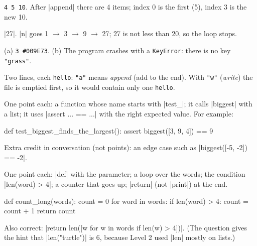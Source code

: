 \begin{answer}
\texttt{4 5 10}. After \py|append| there are 4 items; index 0 is the first (5), index 3 is the new 10.
\end{answer}

\begin{answer}
\py|27|. \py|n| goes 1 $\rightarrow$ 3 $\rightarrow$ 9 $\rightarrow$ 27; 27 is not less than 20,
so the loop stops.
\end{answer}

\begin{answer}
(a) \texttt{3 \#009E73}. (b) The program crashes with a \texttt{KeyError}: there is no key
\texttt{"grass"}.
\end{answer}

\begin{answer}
Two lines, each \texttt{hello}: \texttt{"a"} means \emph{append} (add to the end). With
\texttt{"w"} (\emph{write}) the file is emptied first, so it would contain only one
\texttt{hello}.
\end{answer}

\begin{answer}
One point each: a function whose name starts with \py|test_|; it calls \py|biggest| with a list;
it uses \py|assert ... == ...| with the right expected value. For example:
\begin{pycode}
def test_biggest_finds_the_largest():
    assert biggest([3, 9, 4]) == 9
\end{pycode}
Extra credit in conversation (not points): an edge case such as \py|biggest([-5, -2]) == -2|.
\end{answer}

\begin{answer}
One point each: \py|def| with the parameter; a loop over the words; the condition
\py|len(word) > 4|; a counter that goes up; \py|return| (not \py|print|) at the end.
\begin{pycode}
def count_long(words):
    count = 0
    for word in words:
        if len(word) > 4:
            count = count + 1
    return count
\end{pycode}
Also correct: \py|return len([w for w in words if len(w) > 4])|. (The question gives the hint that
\py|len("turtle")| is 6, because Level 2 used \py|len| mostly on lists.)
\end{answer}

